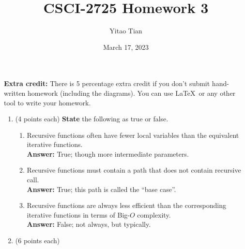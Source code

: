 \documentclass[12pt, a4paper]{article}
\title{CSCI-2725 Homework 3}
\author{Yitao Tian}
\date{March 17, 2023}
\begin{document}
\maketitle

\textbf{Extra credit:} There is 5 percentage extra credit if you don't submit hand-written homework (including the diagrams).
You can use \LaTeX\ or any other tool to write your homework.

\begin{enumerate}

    \item (4 points each) \textbf{State} the following as true or false.
    \begin{enumerate}
    
        \item Recursive functions often have fewer local variables than the equivalent iterative functions. \\
        \hspace*{\fill} \textbf{Answer:} True; though more intermediate parameters.

        \item Recursive functions must contain a path that does not contain recursive call. \\
        \hspace*{\fill} \textbf{Answer:} True; this path is called the ``base case''.
        
        \item Recursive functions are always less efficient than the corresponding iterative functions in terms of Big-$O$ complexity. \\
        \hspace*{\fill} \textbf{Answer:} False; not always, but typically.
    
    \end{enumerate}



    \newpage



    
    
    \item (6 points each)
       

\end{enumerate}
\end{document}
